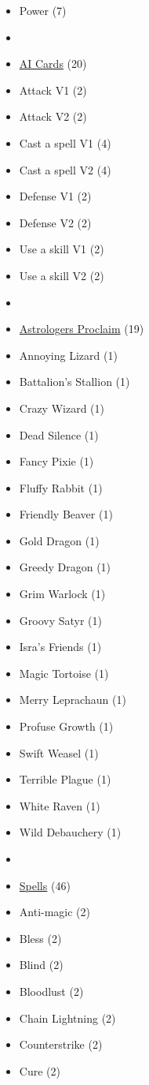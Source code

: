 \begin{multicols}{3}
\begin{itemize}[leftmargin=0pt, label={}, noitemsep, noitemsep]
  \item Power (7)
  \item
  \item \underline{AI Cards} (20)
  \item Attack V1 (2)
  \item Attack V2 (2)
  \item Cast a spell V1 (4)
  \item Cast a spell V2 (4)
  \item Defense V1 (2)
  \item Defense V2 (2)
  \item Use a skill V1 (2)
  \item Use a skill V2 (2)
  \item
  \item \underline{Astrologers Proclaim} (19)
  \item Annoying Lizard (1)
  \item Battalion's Stallion (1)
  \item Crazy Wizard (1)
  \item Dead Silence (1)
  \item Fancy Pixie (1)
  \item Fluffy Rabbit (1)
  \item Friendly Beaver (1)
  \item Gold Dragon (1)
  \item Greedy Dragon (1)
  \item Grim Warlock (1)
  \item Groovy Satyr (1)
  \item Isra's Friends (1)
  \item Magic Tortoise (1)
  \item Merry Leprachaun (1)
  \item Profuse Growth (1)
  \item Swift Weasel (1)
  \item Terrible Plague (1)
  \item White Raven (1)
  \item Wild Debauchery (1)
  \item
  \item \underline{Spells} (46)
  \item Anti-magic (2)
  \item Bless (2)
  \item Blind (2)
  \item Bloodlust (2)
  \item Chain Lightning (2)
  \item Counterstrike (2)
  \item Cure (2)

\end{itemize}
\end{multicols}
